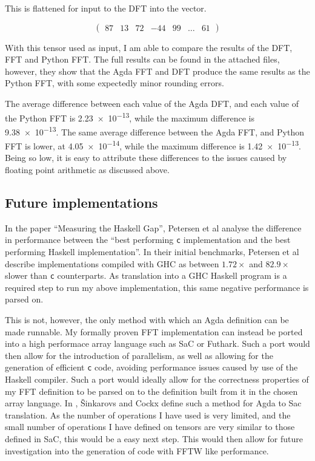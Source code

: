 This is flattened for input to the DFT into the vector.

\[
\begin{pmatrix}
   87  &  13 &  72 & -44 & 99  &  \dots   &  61 
\end{pmatrix}
\]

With this tensor used as input, I am able to compare the results of the DFT,
FFT and Python FFT. 
The full results can be found in the attached files, however, they show that the
Agda FFT and DFT produce the same results as the Python FFT, with some expectedly
minor rounding errors.

The average difference between each value of the Agda DFT, and each value of 
the Python FFT is \num{2.23e-13}, while the maximum difference is \num{9.38e-13}.
The same average difference between the Agda FFT, and Python FFT is lower, at 
\num{4.05e-14}, while the maximum difference is \num{1.42e-13}.
Being so low, it is easy to attribute these differences to the issues 
caused by floating point arithmetic as discussed above.

\subsection{Future implementations}

In the paper ``Measuring the Haskell Gap'', Petersen 
et al analyse the difference in performance between the ``best performing 
\verb|c| implementation and the best performing Haskell implementation''.\cite{PetersenHaskell}
In their initial benchmarks, Petersen et al describe implementations compiled
with GHC as between $1.72\times$ and $82.9\times$ slower than \verb|c| counterparts.\cite{PetersenHaskell}
As translation into a GHC Haskell program is a required step to run my above implementation,
this same negative performance is parsed on.

This is not, however, the only method with which an Agda definition can be
made runnable.
My formally proven FFT implementation can instead be ported into a high performace array language
such as SaC \cite{ScholzSac} or Futhark\cite{Futhark}.
Such a port would then allow for the introduction of parallelism, as well as
allowing for the generation of efficient \verb|c|
code, avoiding performance issues caused by use of the Haskell compiler.
Such a port would ideally allow for the correctness properties of my 
FFT definition to be parsed on to the definition built from it in the chosen array language.
In \cite{ChoosingIsLosing}, Šinkarovs and Cockx define such a method for Agda to Sac 
translation.
As the number of operations I have used is very limited, and the small number of operations I
have defined on tensors are very similar to those defined in SaC, this would be 
a easy next step.
This would then allow for future investigation into the generation of code with FFTW like
performance.

